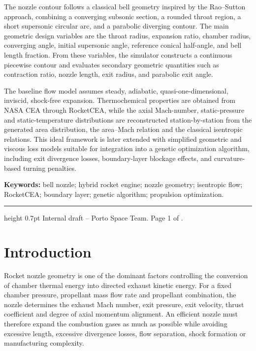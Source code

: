 \documentclass[11pt,a4paper]{article}
\begin{document}
\begin{titlepage}
The nozzle contour follows a classical bell geometry inspired by the Rao--Sutton approach, combining a converging subsonic section, a rounded throat region, a short supersonic circular arc, and a parabolic diverging contour. The main geometric design variables are the throat radius, expansion ratio, chamber radius, converging angle, initial supersonic angle, reference conical half-angle, and bell length fraction. From these variables, the simulator constructs a continuous piecewise contour and evaluates secondary geometric quantities such as contraction ratio, nozzle length, exit radius, and parabolic exit angle.

The baseline flow model assumes steady, adiabatic, quasi-one-dimensional, inviscid, shock-free expansion. Thermochemical properties are obtained from NASA CEA through RocketCEA, while the axial Mach-number, static-pressure and static-temperature distributions are reconstructed station-by-station from the generated area distribution, the area--Mach relation and the classical isentropic relations. This ideal framework is later extended with simplified geometric and viscous loss models suitable for integration into a genetic optimization algorithm, including exit divergence losses, boundary-layer blockage effects, and curvature-based turning penalties.

\vfill
\noindent\textbf{Keywords:} bell nozzle; hybrid rocket engine; nozzle geometry; isentropic flow; RocketCEA; boundary layer; genetic algorithm; propulsion optimization.

\vspace{6mm}
\hrule height 0.7pt
\vspace{2mm}
\small Internal draft -- Porto Space Team. Page 1 of \pageref{LastPage}.

\end{titlepage}

\newpage
\tableofcontents
\newpage
\listoffigures
\newpage

\section{Introduction}

Rocket nozzle geometry is one of the dominant factors controlling the conversion of chamber thermal energy into directed exhaust kinetic energy. For a fixed chamber pressure, propellant mass flow rate and propellant combination, the nozzle determines the exhaust Mach number, exit pressure, exit velocity, thrust coefficient and degree of axial momentum alignment. An efficient nozzle must therefore expand the combustion gases as much as possible while avoiding excessive length, excessive divergence losses, flow separation, shock formation or manufacturing complexity.
\end{document}
